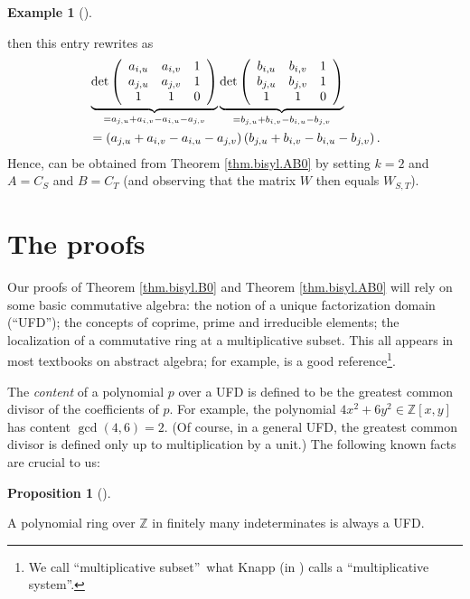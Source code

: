 \documentclass[numbers=enddot,12pt,final,onecolumn,notitlepage]{scrartcl}%
\theoremstyle{definition}
\newtheorem{prop}[theo]{Proposition}
\newenvironment{proposition}[1][]
{\begin{prop}[#1]\begin{leftbar}}
{\end{leftbar}\end{prop}}
\newtheorem{exam}[theo]{Example}
\newenvironment{example}[1][]
{\begin{exam}[#1]\begin{leftbar}}
{\end{leftbar}\end{exam}}
\begin{document}
\begin{example}
then this entry rewrites as%
\begin{align*}
&  \underbrace{\det\left(
\begin{array}
[c]{ccc}%
a_{i,u} & a_{i,v} & 1\\
a_{j,u} & a_{j,v} & 1\\
1 & 1 & 0
\end{array}
\right)  }_{=a_{j,u}+a_{i,v}-a_{i,u}-a_{j,v}}\underbrace{\det\left(
\begin{array}
[c]{ccc}%
b_{i,u} & b_{i,v} & 1\\
b_{j,u} & b_{j,v} & 1\\
1 & 1 & 0
\end{array}
\right)  }_{=b_{j,u}+b_{i,v}-b_{i,u}-b_{j,v}}\\
&  =\left(  a_{j,u}+a_{i,v}-a_{i,u}-a_{j,v}\right)  \left(  b_{j,u}%
+b_{i,v}-b_{i,u}-b_{j,v}\right)  .
\end{align*}
Hence, \cite[Theorem 10]{GriOlv18} can be obtained from Theorem
\ref{thm.bisyl.AB0} by setting $k=2$ and $A=C_{S}$ and $B=C_{T}$ (and
observing that the matrix $W$ then equals $W_{S,T}$).
\end{example}

\section{The proofs}

Our proofs of Theorem \ref{thm.bisyl.B0} and Theorem \ref{thm.bisyl.AB0} will
rely on some basic commutative algebra: the notion of a unique factorization
domain (\textquotedblleft UFD\textquotedblright); the concepts of coprime,
prime and irreducible elements; the localization of a commutative ring at a
multiplicative subset. This all appears in most textbooks on abstract algebra;
for example, \cite[Sections VIII.4 and VIII.10]{Knapp16} is a good
reference\footnote{We call \textquotedblleft multiplicative
subset\textquotedblright\ what Knapp (in \cite[Section VIII.10]{Knapp16})
calls a \textquotedblleft multiplicative system\textquotedblright.}.

The \textit{content} of a polynomial $p$ over a UFD is defined to be the
greatest common divisor of the coefficients of $p$. For example, the
polynomial $4x^{2}+6y^{2}\in\mathbb{Z}\left[  x,y\right]  $ has content
$\gcd\left(  4,6\right)  =2$. (Of course, in a general UFD, the greatest
common divisor is defined only up to multiplication by a unit.) The following
known facts are crucial to us:

\begin{proposition}
\label{prop.poly.Zufd}A polynomial ring over $\mathbb{Z}$ in finitely many
indeterminates is always a UFD.
\end{proposition}
\end{document}
